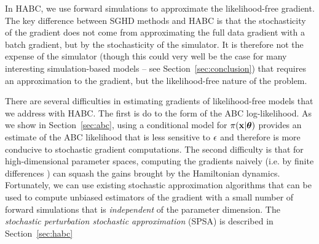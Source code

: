 \documentclass[]{article}
\begin{document}
In HABC, we use forward simulations to approximate the likelihood-free gradient. The key difference between SGHD methods and HABC is that the stochasticity of the gradient does not come from approximating the full data gradient with a batch gradient, but by the stochasticity of the simulator.  It is therefore not the expense of the simulator (though this could very well be the case for many interesting simulation-based models -- see Section~\ref{sec:conclusion}) that requires an approximation to the gradient, but the likelihood-free nature of the problem.  

There are several difficulties in estimating gradients of likelihood-free models that we address with HABC.  The first is do to the form of the ABC log-likelihood.  As we show in Section~\ref{sec:abc}, using a conditional model for $\pi( {\bf x} | {\bm \theta} )$ provides an estimate of the ABC likelihood that is less sensitive to $\epsilon$ and therefore is more conducive to stochastic gradient computations.  The second difficulty is that for high-dimensional parameter spaces, computing the gradients naively (i.e. by finite differences \cite{kiefer1952stochastic}) can squash the gains brought by the Hamiltonian dynamics.  Fortunately, we can use existing stochastic approximation algorithms \cite{spall1992multivariate,spall2000adaptive} that can be used to compute unbiased estimators of the gradient with a small number of forward simulations that is {\em independent} of the parameter dimension.  The {\em stochastic perturbation stochastic approximation} (SPSA) \cite{spall1992multivariate} is described in Section~\ref{sec:habc}




\end{document}
